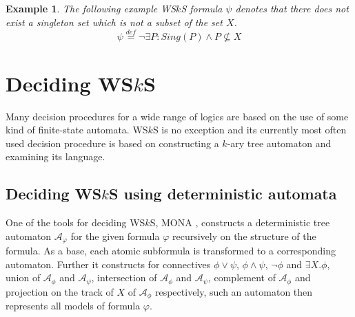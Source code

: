\documentclass{eeict}
\newtheorem{example}{Example}[section]
\begin{document}
\begin{example} The following example WS$k$S formula $\psi$ denotes that there
does not exist a singleton set which is not a subset of the set $X$.
\begin{equation}
 \psi \overset{\mathit{def}}{=} \neg\exists P: Sing(P) \wedge P
 \not\subseteq X
 \label{varphi}
\end{equation}
\end{example}

\section{Deciding WS$k$S}

Many decision procedures for a wide range of logics are based on the use of some
kind of finite-state automata. WS$k$S is no exception and its currently most
often used decision procedure is based on constructing a $k$-ary tree automaton
and examining its language.

\subsection{Deciding WS$k$S using deterministic automata}

One of the tools for deciding WS$k$S, MONA \cite{mona}, constructs a
deterministic tree automaton $\mathcal{A}_\varphi$ for the given formula
$\varphi$ recursively on the structure of the formula. As a base, each atomic
subformula is transformed to a corresponding automaton.
Further it constructs for connectives $\phi \vee
\psi$, $\phi \wedge \psi$, $\neg \phi$ and $\exists X. \phi$, union of
$\mathcal{A}_\phi$ and $\mathcal{A}_\psi$, intersection of $\mathcal{A}_\phi$
and $\mathcal{A}_\psi$, complement of $\mathcal{A}_\phi$ and projection on the
track of $X$ of $\mathcal{A}_\phi$ respectively, such an automaton then
represents all models of formula $\varphi$.
\end{document}
